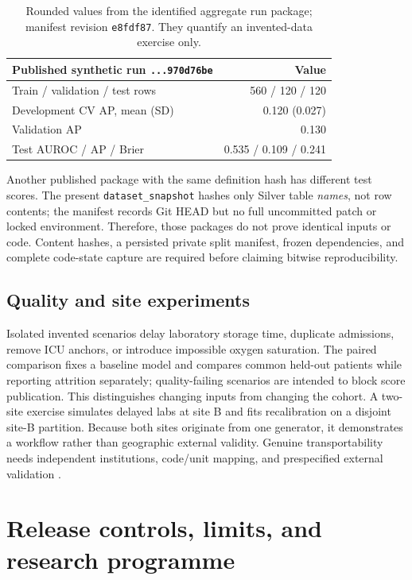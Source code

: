 \documentclass[11pt,a4paper]{article}
\begin{document}
\begin{table}[ht]
\centering\small
\begin{tabular}{lr}
\toprule
Published synthetic run \texttt{...970d76be} & Value \\
\midrule
Train / validation / test rows & 560 / 120 / 120 \\
Development CV AP, mean (SD) & 0.120 (0.027) \\
Validation AP & 0.130 \\
Test AUROC / AP / Brier & 0.535 / 0.109 / 0.241 \\
\bottomrule
\end{tabular}
\caption{Rounded values from the identified aggregate run package; manifest revision \texttt{e8fdf87}. They quantify an invented-data exercise only.}
\label{tab:run}
\end{table}

Another published package with the same definition hash has different test scores. The present \texttt{dataset\_snapshot} hashes only Silver table \emph{names}, not row contents; the manifest records Git HEAD but no full uncommitted patch or locked environment. Therefore, those packages do not prove identical inputs or code. Content hashes, a persisted private split manifest, frozen dependencies, and complete code-state capture are required before claiming bitwise reproducibility.

\subsection{Quality and site experiments}

Isolated invented scenarios delay laboratory storage time, duplicate admissions, remove ICU anchors, or introduce impossible oxygen saturation. The paired comparison fixes a baseline model and compares common held-out patients while reporting attrition separately; quality-failing scenarios are intended to block score publication. This distinguishes changing inputs from changing the cohort. A two-site exercise simulates delayed labs at site B and fits recalibration on a disjoint site-B partition. Because both sites originate from one generator, it demonstrates a workflow rather than geographic external validity. Genuine transportability needs independent institutions, code/unit mapping, and prespecified external validation \cite{riley2024}.

\section{Release controls, limits, and research programme}
\end{document}
